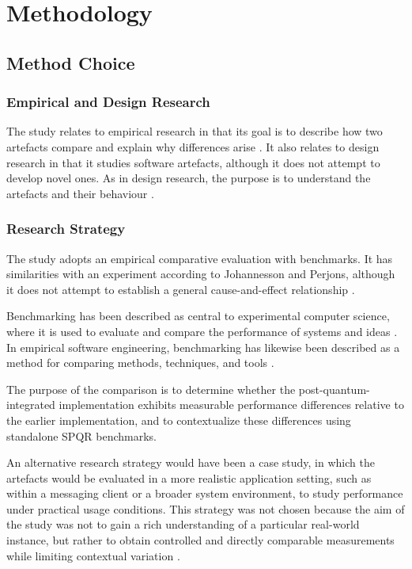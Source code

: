 \chapter{Methodology}

\section{Method Choice}

\subsection{Empirical and Design Research}

The study relates to empirical research in that its goal is to describe how two artefacts compare and explain why differences arise \cite{ref21}. It also relates to design research in that it studies software artefacts, although it does not attempt to develop novel ones. As in design research, the purpose is to understand the artefacts and their behaviour \cite{ref21}.

\subsection{Research Strategy}

The study adopts an empirical comparative evaluation with benchmarks. It has similarities with an experiment according to Johannesson and Perjons, although it does not attempt to establish a general cause-and-effect relationship \cite{ref21}. 

Benchmarking has been described as central to experimental computer science, where it is used to evaluate and compare the performance of systems and ideas \cite{ref23}. In empirical software engineering, benchmarking has likewise been described as a method for comparing methods, techniques, and tools \cite{ref22}.

The purpose of the comparison is to determine whether the post-quantum-integrated implementation exhibits measurable performance differences relative to the earlier implementation, and to contextualize these differences using standalone SPQR benchmarks.

An alternative research strategy would have been a case study, in which the artefacts would be evaluated in a more realistic application setting, such as within a messaging client or a broader system environment, to study performance under practical usage conditions. This strategy was not chosen because the aim of the study was not to gain a rich understanding of a particular real-world instance, but rather to obtain controlled and directly comparable measurements while limiting contextual variation \cite{ref21}.

